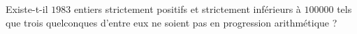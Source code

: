 Existe-t-il $1983$ entiers strictement positifs et strictement inférieurs à $100000$ tels que trois quelconques d'entre eux ne soient pas en progression arithmétique ?

